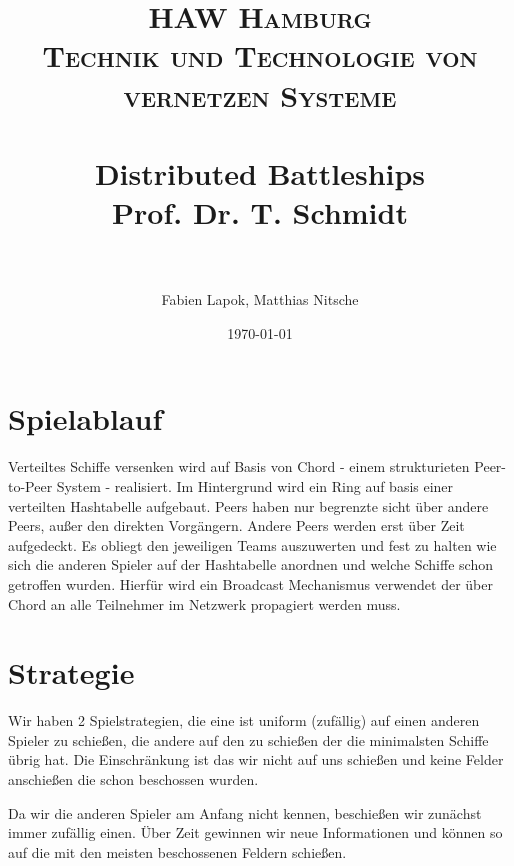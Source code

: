 \documentclass[paper=a4, fontsize=11pt]{scrartcl} %
\title {
  \normalfont \normalsize
  \textsc{HAW Hamburg} \\ [25pt] %
  \textsc{Technik und Technologie von vernetzen Systeme} \\ [15pt]
  \horrule{0.5pt} \\[0.4cm] %
  \huge Distributed Battleships \\ [15pt] %
  \small  Prof. Dr. T. Schmidt \\
  \horrule{2pt} \\[0.5cm] %
}
\author{Fabien Lapok, Matthias Nitsche}
\date{\normalsize\today}
\numberwithin{equation}{section} %
\numberwithin{figure}{section} %
\numberwithin{table}{section} %
\begin{document}
\maketitle

\section{Spielablauf}

Verteiltes Schiffe versenken wird auf Basis von Chord - einem strukturieten Peer-to-Peer System - realisiert. Im Hintergrund wird ein Ring auf basis einer verteilten Hashtabelle aufgebaut. Peers haben nur begrenzte sicht über andere Peers, außer den direkten Vorgängern. Andere Peers werden erst über Zeit aufgedeckt. Es obliegt den jeweiligen Teams auszuwerten und fest zu halten wie sich die anderen Spieler auf der Hashtabelle anordnen und welche Schiffe schon getroffen wurden. Hierfür wird ein Broadcast Mechanismus verwendet der über Chord an alle Teilnehmer im Netzwerk propagiert werden muss.

\section{Strategie}

Wir haben 2 Spielstrategien, die eine ist uniform (zufällig) auf einen anderen Spieler zu schießen, die andere auf den zu schießen der die minimalsten Schiffe übrig hat. Die Einschränkung ist das wir nicht auf uns schießen und keine Felder anschießen die schon beschossen wurden.

Da wir die anderen Spieler am Anfang nicht kennen, beschießen wir zunächst immer zufällig einen. Über Zeit gewinnen wir neue Informationen und können so auf die mit den meisten beschossenen Feldern schießen.
\end{document}

